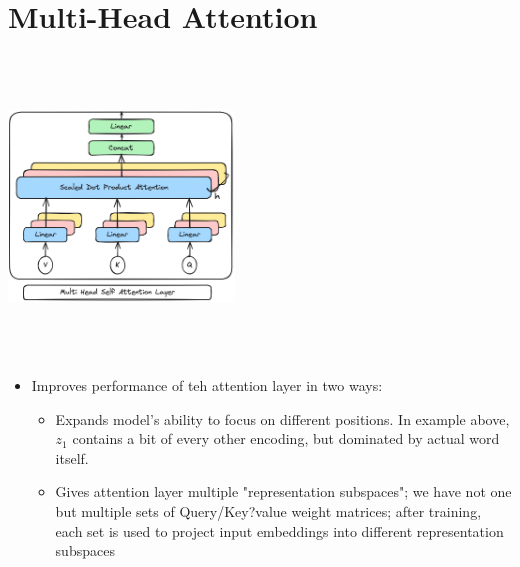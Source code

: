 \documentclass{article}
\begin{document}
\section{Multi-Head Attention}
\begin{minipage}{0.5\textwidth}
\includegraphics[width=6cm, height=8cm]{Transformer/Images/MultiHeadAttention1.png}
\end{minipage}
\begin{minipage}{0.5\textwidth}
\begin{itemize}
    \item Improves performance of teh attention layer in two ways:
    \begin{itemize}
        \item Expands model's ability to focus on different positions. In example above, $z_1$ contains a bit of every other encoding, but dominated by actual word itself.
        \item Gives attention layer multiple "representation subspaces"; we have not one but multiple sets of Query/Key?value weight matrices; after training, each set is used to project input embeddings into different representation subspaces
    \end{itemize}
\end{itemize}
\end{minipage}
\end{document}
